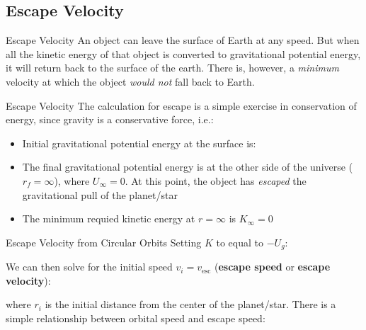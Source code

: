 \documentclass[12pt,compress,aspectratio=169]{beamer}
\begin{document}
\subsection{Escape Velocity}

\begin{frame}{Escape Velocity}
  An object can leave the surface of Earth at any speed. But when all the
  kinetic energy of that object is converted to gravitational potential energy,
  it will return back to the surface of the earth. There is, however, a
  \emph{minimum} velocity at which the object \emph{would not} fall back to
  Earth.
\end{frame}



\begin{frame}{Escape Velocity}
  The calculation for escape is a simple exercise in conservation of energy,
  since gravity is a conservative force, i.e.:

  \begin{itemize}
  \item Initial gravitational potential energy at the surface is:

  \item The final gravitational potential energy is at the other side of the
    universe ($r_f=\infty$), where $U_\infty=0$. At this point, the object has
    \emph{escaped} the gravitational pull of the planet/star
  \item The minimum requied kinetic energy at $r=\infty$ is $K_\infty=0$
  \end{itemize}
\end{frame}



\begin{frame}{Escape Velocity from Circular Orbits}
  Setting $K$ to equal to $-U_g$:


  We can then solve for the initial speed $v_i=v_\text{esc}$
  (\textbf{escape speed} or \textbf{escape velocity}):


  where $r_i$ is the initial distance from the center of the planet/star. There
  is a simple relationship between orbital speed and escape speed:

\end{frame}
\end{document}
